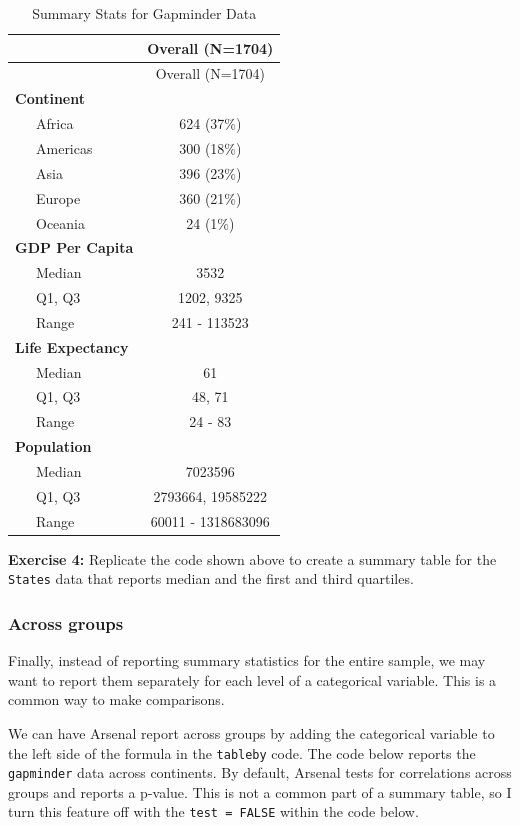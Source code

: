 \documentclass[
]{book}
\newenvironment{learncheck}%
{%
  \par\vspace{\baselineskip}\noindent 
  \color{Exercise}\begin{itshape}%
  \par\vspace{\baselineskip}\noindent\ignorespaces 
}%
{%
  \end{itshape}\ignorespacesafterend 
}
\begin{document}
\begin{longtable}[]{@{}lc@{}}
\caption{Summary Stats for Gapminder Data}\tabularnewline
\toprule
& Overall (N=1704)\tabularnewline
\midrule
\endfirsthead
\toprule
& Overall (N=1704)\tabularnewline
\midrule
\endhead
\textbf{Continent} &\tabularnewline
~~~Africa & 624 (37\%)\tabularnewline
~~~Americas & 300 (18\%)\tabularnewline
~~~Asia & 396 (23\%)\tabularnewline
~~~Europe & 360 (21\%)\tabularnewline
~~~Oceania & 24 (1\%)\tabularnewline
\textbf{GDP Per Capita} &\tabularnewline
~~~Median & 3532\tabularnewline
~~~Q1, Q3 & 1202, 9325\tabularnewline
~~~Range & 241 - 113523\tabularnewline
\textbf{Life Expectancy} &\tabularnewline
~~~Median & 61\tabularnewline
~~~Q1, Q3 & 48, 71\tabularnewline
~~~Range & 24 - 83\tabularnewline
\textbf{Population} &\tabularnewline
~~~Median & 7023596\tabularnewline
~~~Q1, Q3 & 2793664, 19585222\tabularnewline
~~~Range & 60011 - 1318683096\tabularnewline
\bottomrule
\end{longtable}

\begin{learncheck}
\textbf{Exercise 4:} Replicate the code shown above to create a summary
table for the \texttt{States} data that reports median and the first and
third quartiles.
\end{learncheck}

\hypertarget{across-groups}{%
\subsubsection*{Across groups}\label{across-groups}}

Finally, instead of reporting summary statistics for the entire sample, we may want to report them separately for each level of a categorical variable. This is a common way to make comparisons.

We can have Arsenal report across groups by adding the categorical variable to the left side of the formula in the \texttt{tableby} code. The code below reports the \texttt{gapminder} data across continents. By default, Arsenal tests for correlations across groups and reports a p-value. This is not a common part of a summary table, so I turn this feature off with the \texttt{test\ =\ FALSE} within the code below.
\end{document}
